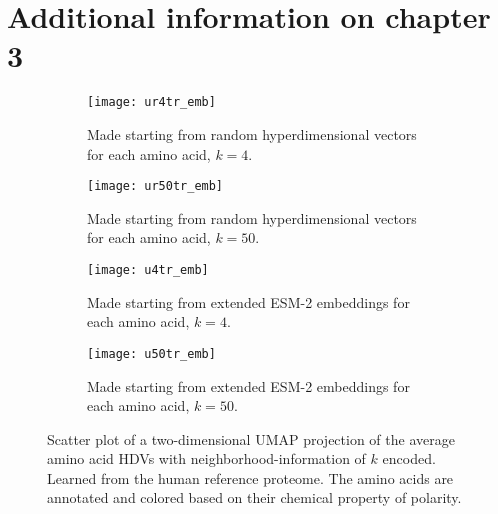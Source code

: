 \chapter{Additional information on chapter 3}\label{app:chp3}
\begin{figure}[h!]
    \centering
    \begin{subfigure}{0.48\textwidth}
        \texttt{[image: ur4tr\_emb]}
        \caption{Made starting from random hyperdimensional vectors for each amino acid, $k=4$.}
        \label{fig:AAtr4ru}
    \end{subfigure}
    \hfill
    \begin{subfigure}{0.48\textwidth}
        \texttt{[image: ur50tr\_emb]}
        \caption{Made starting from random hyperdimensional vectors for each amino acid, $k=50$.}
        \label{fig:AAtr50ru}
    \end{subfigure}
    
    \begin{subfigure}{0.48\textwidth}
        \texttt{[image: u4tr\_emb]}
        \caption{Made starting from extended ESM-2 embeddings for each amino acid, $k=4$.}
        \label{fig:AAtr4u}
    \end{subfigure}
    \hfill
    \begin{subfigure}{0.48\textwidth}
        \texttt{[image: u50tr\_emb]}
        \caption{Made starting from extended ESM-2 embeddings for each amino acid, $k=50$.}
        \label{fig:AAtr50u}
    \end{subfigure}
    \caption{Scatter plot of a two-dimensional UMAP projection of the average amino acid HDVs with neighborhood-information of $k$ encoded. Learned from the human reference proteome. The amino acids are annotated and colored based on their chemical property of polarity.}
    \label{fig:main3}
\end{figure}


